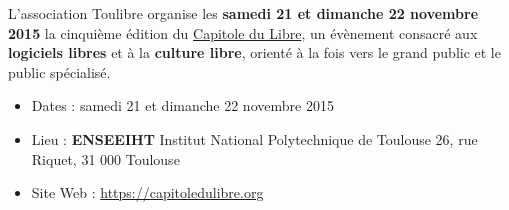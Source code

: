 

\begin{doublespace}
\begin{large}
  L'association Toulibre organise les \textbf{samedi 21 et dimanche 22 novembre 2015} la cinquième
  édition du \href{http://capitoledulibre.org}{Capitole du Libre},
  un évènement consacré aux \textbf{logiciels libres} et à la \textbf{culture libre},
  orienté à la fois vers le grand public et le public spécialisé.
\end{large}
\end{doublespace}
\begin{itemize}[label=$\bullet$]
\item Dates : samedi 21 et dimanche 22 novembre 2015
\item Lieu : \textbf{ENSEEIHT} Institut National Polytechnique de Toulouse
26, rue Riquet, 31 000 Toulouse
\item Site Web : \url{https://capitoledulibre.org}
\end{itemize}
